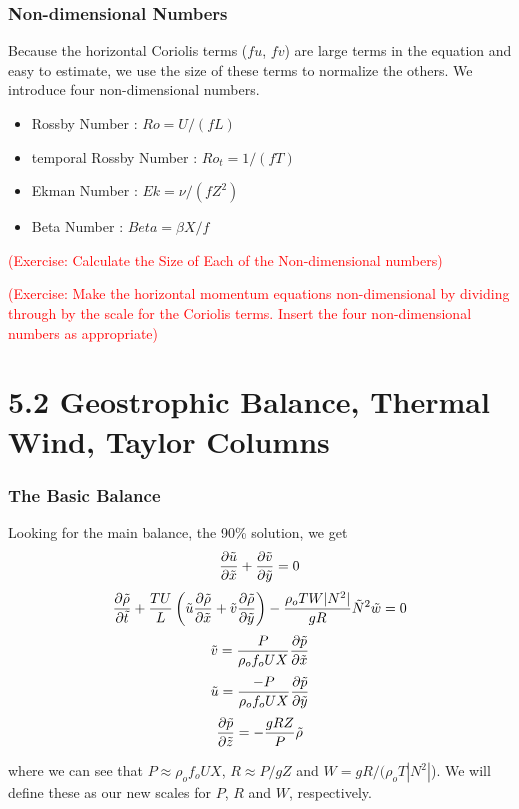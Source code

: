 \documentclass[xcolor=dvipsnames]{beamer}
\begin{document}
\begin{frame}
  \frametitle{Non-dimensional Numbers}   %
Because the horizontal Coriolis terms ($fu$, $fv$) are large terms in the equation and easy to estimate, we use the size of these terms to normalize the others.  We introduce four non-dimensional numbers. 
\begin{itemize}
\item Rossby Number : $Ro = U/(fL)$
\item temporal Rossby Number : $Ro_t = 1/(fT)$
\item Ekman Number : $Ek = \nu /(f Z^2)$
\item Beta Number : $Beta = \beta X / f$
\end{itemize}

  \textcolor{red}{(Exercise: Calculate the Size of Each of the Non-dimensional numbers)}

\textcolor{red}{(Exercise: Make the horizontal momentum equations non-dimensional by dividing through by the scale for the Coriolis terms.  Insert the four non-dimensional numbers as appropriate)}
\end{frame}

\section{5.2 Geostrophic Balance, Thermal Wind, Taylor Columns}

\begin{frame}
\frametitle{The Basic Balance}
Looking for the main balance, the 90\% solution, we get
\begin{equation}
\frac{\partial \tilde u}{\partial \tilde x} + \frac{\partial \tilde v}{\partial \tilde y} = 0
\end{equation}
\begin{equation}
\frac{\partial \tilde \rho}{\partial \tilde t} + \frac{TU}{L} \left( \tilde u \frac{\partial \tilde \rho}{\partial \tilde x} +\tilde v \frac{\partial \tilde \rho}{\partial \tilde y} \right) - \frac{\rho_o TW |N^2|}{gR} \tilde N^2  \tilde w =0
\end{equation}
\begin{equation}
\tilde v = \frac{P}{\rho_o f_o UX} \frac{\partial \tilde p}{\partial \tilde x}
\end{equation}
\begin{equation}
\tilde u = \frac{-P}{\rho_o f_o UX} \frac{\partial \tilde p}{\partial \tilde y}
\end{equation}
\begin{equation}
\frac{\partial \tilde p}{\partial \tilde z} = -\frac{gRZ}{P} \tilde \rho 
\end{equation}

where we can see that $P \approx \rho_o f_o UX$, $R \approx P/gZ$ and $W = gR/(\rho_o T |N^2|$).  We will define these as our new scales for $P$, $R$ and $W$, respectively.

\end{frame}
\end{document}
